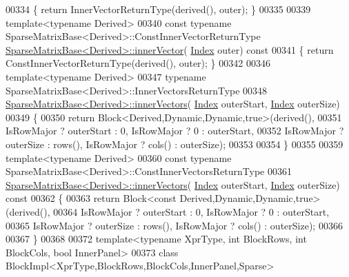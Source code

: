 \begin{DoxyCode}
00334 \{ \textcolor{keywordflow}{return} InnerVectorReturnType(derived(), outer); \}
00335 
00339 \textcolor{keyword}{template}<\textcolor{keyword}{typename} Derived>
00340 \textcolor{keyword}{const} \textcolor{keyword}{typename} SparseMatrixBase<Derived>::ConstInnerVectorReturnType 
      \hyperlink{group___sparse_core___module_a65aaf3b50d205011e2bfa0de24756cce}{SparseMatrixBase<Derived>::innerVector}(
      \hyperlink{namespace_eigen_a62e77e0933482dafde8fe197d9a2cfde}{Index} outer)\textcolor{keyword}{ const}
00341 \textcolor{keyword}{}\{ \textcolor{keywordflow}{return} ConstInnerVectorReturnType(derived(), outer); \}
00342 
00346 \textcolor{keyword}{template}<\textcolor{keyword}{typename} Derived>
00347 \textcolor{keyword}{typename} SparseMatrixBase<Derived>::InnerVectorsReturnType
00348 \hyperlink{group___sparse_core___module_a3c51bf5a7eb18eab9a85949d03aed14a}{SparseMatrixBase<Derived>::innerVectors}(
      \hyperlink{namespace_eigen_a62e77e0933482dafde8fe197d9a2cfde}{Index} outerStart, \hyperlink{namespace_eigen_a62e77e0933482dafde8fe197d9a2cfde}{Index} outerSize)
00349 \{
00350   \textcolor{keywordflow}{return} Block<Derived,Dynamic,Dynamic,true>(derived(),
00351                                              IsRowMajor ? outerStart : 0, IsRowMajor ? 0 : outerStart,
00352                                              IsRowMajor ? outerSize : rows(), IsRowMajor ? cols() : 
      outerSize);
00353 
00354 \}
00355 
00359 \textcolor{keyword}{template}<\textcolor{keyword}{typename} Derived>
00360 \textcolor{keyword}{const} \textcolor{keyword}{typename} SparseMatrixBase<Derived>::ConstInnerVectorsReturnType
00361 \hyperlink{group___sparse_core___module_a3c51bf5a7eb18eab9a85949d03aed14a}{SparseMatrixBase<Derived>::innerVectors}(
      \hyperlink{namespace_eigen_a62e77e0933482dafde8fe197d9a2cfde}{Index} outerStart, \hyperlink{namespace_eigen_a62e77e0933482dafde8fe197d9a2cfde}{Index} outerSize)\textcolor{keyword}{ const}
00362 \textcolor{keyword}{}\{
00363   \textcolor{keywordflow}{return} Block<const Derived,Dynamic,Dynamic,true>(derived(),
00364                                                   IsRowMajor ? outerStart : 0, IsRowMajor ? 0 : outerStart,
00365                                                   IsRowMajor ? outerSize : rows(), IsRowMajor ? cols() : 
      outerSize);
00366 
00367 \}
00368 
00372 \textcolor{keyword}{template}<\textcolor{keyword}{typename} XprType, \textcolor{keywordtype}{int} BlockRows, \textcolor{keywordtype}{int} BlockCols, \textcolor{keywordtype}{bool} InnerPanel>
00373 \textcolor{keyword}{class }BlockImpl<XprType,BlockRows,BlockCols,InnerPanel,Sparse>

\end{DoxyCode}
